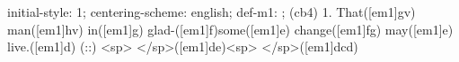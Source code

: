 initial-style: 1;
centering-scheme: english;
def-m1: \grealign;
(cb4) 1. That([em1]gv) man([em1]hv) in([em1]g) glad-([em1]f)some([em1]e) change([em1]fg) may([em1]e) live.([em1]d) (::) <sp> </sp>([em1]de)<sp> </sp>([em1]dcd)
